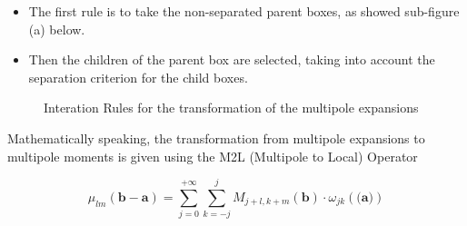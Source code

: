 \documentclass[11pt,twoside,a4paper]{report}
\begin{document}
	\begin{itemize}
	
	\item The first rule is to take the non-separated parent boxes, as showed sub-figure (a) below.
	\item Then the children of the parent box are selected, taking into account the separation criterion for the child boxes.
	
	\end{itemize}	   
   
	 
 \begin{figure}[H]
    \centering 
    \caption{Interation Rules for the transformation of the multipole expansions}
    \label{fig:multipole}
   \end{figure}   
   
	  Mathematically speaking, the transformation from multipole expansions to multipole moments is given using the  M2L (Multipole to Local) Operator
	  
	  \begin{equation}
	  \mu_{lm}(\textbf{b} - \textbf{a}) = \sum\limits_{j = 0}^{+\infty} \sum\limits_{k=-j}^{j}
	  M_{j+l,k+m}(\textbf{b}) \cdot \omega_{jk}(\textbf{(a)})
	  \end{equation}
   
\end{document}
